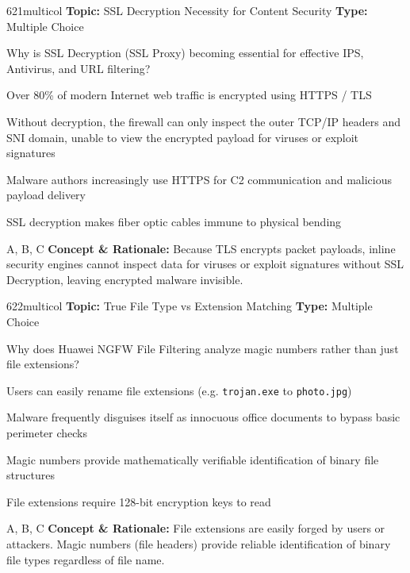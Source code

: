 \begin{qcard}{621}{multicol}
\textcolor{darkslate!75}{\small\textbf{Topic:} SSL Decryption Necessity for Content Security \hfill \textbf{Type:} Multiple Choice}\vspace{0.4em}\par
Why is SSL Decryption (SSL Proxy) becoming essential for effective IPS, Antivirus, and URL filtering?
\begin{qoptions}
\item Over 80\% of modern Internet web traffic is encrypted using HTTPS / TLS
\item Without decryption, the firewall can only inspect the outer TCP/IP headers and SNI domain, unable to view the encrypted payload for viruses or exploit signatures
\item Malware authors increasingly use HTTPS for C2 communication and malicious payload delivery
\item SSL decryption makes fiber optic cables immune to physical bending
\end{qoptions}
\end{qcard}
\nopagebreak
\begin{explainbox}{A, B, C}
\textbf{Concept \& Rationale:} Because TLS encrypts packet payloads, inline security engines cannot inspect data for viruses or exploit signatures without SSL Decryption, leaving encrypted malware invisible.
\end{explainbox}

\begin{qcard}{622}{multicol}
\textcolor{darkslate!75}{\small\textbf{Topic:} True File Type vs Extension Matching \hfill \textbf{Type:} Multiple Choice}\vspace{0.4em}\par
Why does Huawei NGFW File Filtering analyze magic numbers rather than just file extensions?
\begin{qoptions}
\item Users can easily rename file extensions (e.g. \texttt{trojan.exe} to \texttt{photo.jpg})
\item Malware frequently disguises itself as innocuous office documents to bypass basic perimeter checks
\item Magic numbers provide mathematically verifiable identification of binary file structures
\item File extensions require 128-bit encryption keys to read
\end{qoptions}
\end{qcard}
\nopagebreak
\begin{explainbox}{A, B, C}
\textbf{Concept \& Rationale:} File extensions are easily forged by users or attackers. Magic numbers (file headers) provide reliable identification of binary file types regardless of file name.
\end{explainbox}

